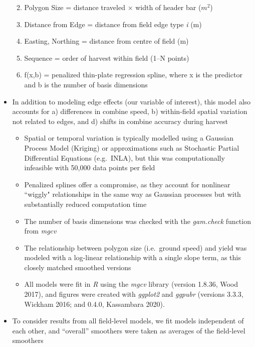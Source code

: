 \documentclass[]{elsarticle} %
\providecommand{\tightlist}{%
  \setlength{\itemsep}{0pt}\setlength{\parskip}{0pt}}
\begin{document}
\begin{itemize}
  \begin{enumerate}
  \def\labelenumi{\arabic{enumi}.}
  \tightlist
  \item
    Polygon Size = distance traveled \(\times\) width of header bar (\(m^2\))
  \item
    Distance from Edge = distance from field edge type \emph{i} (m)
  \item
    Easting, Northing = distance from centre of field (m)
  \item
    Sequence = order of harvest within field (1--N points)
  \item
    f(x,b) = penalized thin-plate regression spline, where x is the predictor and b is the number of basis dimensions
  \end{enumerate}
\item
  In addition to modeling edge effects (our variable of interest), this model also accounts for a) differences in combine speed, b) within-field spatial variation not related to edges, and d) shifts in combine accuracy during harvest

  \begin{itemize}
  \tightlist
  \item
    Spatial or temporal variation is typically modelled using a Gaussian Process Model (Kriging) or approximations such as Stochastic Partial Differential Equations (e.g.~INLA), but this was computationally infeasible with 50,000 data points per field
  \item
    Penalized splines offer a compromise, as they account for nonlinear ``wiggly" relationships in the same way as Gaussian processes but with substantially reduced computation time
  \item
    The number of basis dimensions was checked with the \emph{gam.check} function from \emph{mgcv}
  \item
    The relationship between polygon size (i.e.~ground speed) and yield was modeled with a log-linear relationship with a single slope term, as this closely matched smoothed versions
  \item
    All models were fit in \emph{R} using the \emph{mgcv} library (version 1.8.36, Wood 2017), and figures were created with \emph{ggplot2} and \emph{ggpubr} (versions 3.3.3, Wickham 2016; and 0.4.0, Kassambara 2020).
  \end{itemize}
\item
  To consider results from all field-level models, we fit models independent of each other, and ``overall'' smoothers were taken as averages of the field-level smoothers


\end{itemize}
\end{document}
